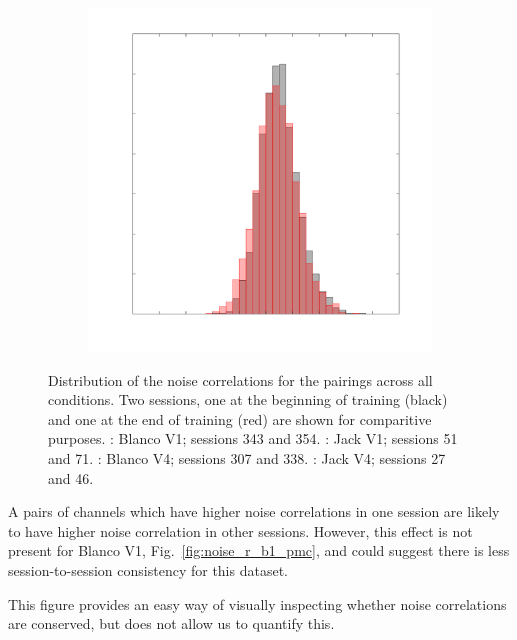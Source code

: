 \begin{figure}[htbp]
\begin{subfigure}[b]{0.5\linewidth}
        \includegraphics[width=\linewidth]{./figures/ncl_decoding/rcoef_sess_histallover_v4_jack.pdf}
    \end{subfigure}
    \caption{Distribution of the noise correlations for the pairings across all conditions.
Two sessions, one at the beginning of training (black) and one at the end of training (red) are shown for comparitive purposes.
\protect{}: Blanco V1; sessions 343 and 354.
\protect{}: Jack V1; sessions 51 and 71.
\protect{}: Blanco V4; sessions 307 and 338.
\protect{}: Jack V4; sessions 27 and 46.
}
    \label{fig:noise_r_hist}
\end{figure}


A pairs of channels which have higher noise correlations in one session are likely to have higher noise correlation in other sessions. However, this effect is not present for Blanco V1, Fig.~\ref{fig:noise_r_b1_pmc}, and could suggest there is less session-to-session consistency for this dataset.

This figure provides an easy way of visually inspecting whether noise correlations are conserved, but does not allow us to quantify this.

